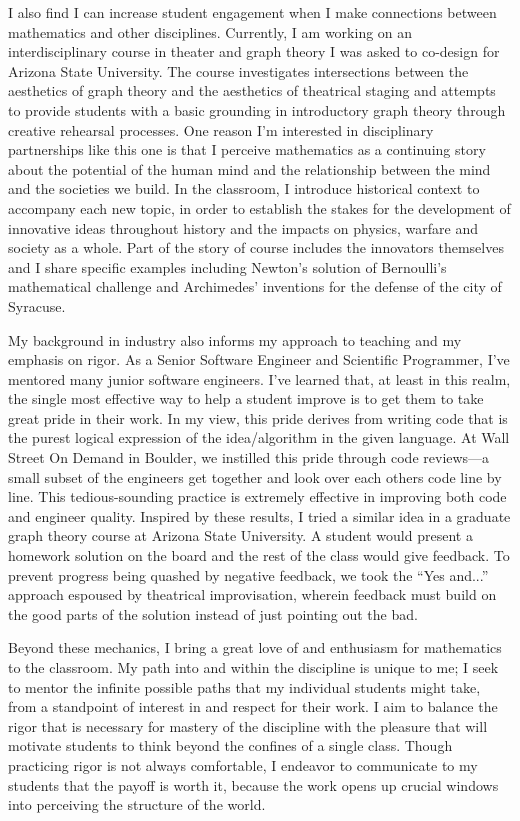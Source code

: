 \documentclass[12pt]{article}
\begin{document}
I also find I can increase student engagement when I make connections between mathematics and other disciplines. Currently, I am working on an interdisciplinary course in theater and graph theory I was asked to co-design for Arizona State University. The course investigates intersections between the aesthetics of graph theory and the aesthetics of theatrical staging and attempts to provide students with a basic grounding in introductory graph theory through creative rehearsal processes. One reason I'm interested in disciplinary partnerships like this one is that I perceive mathematics as a continuing story about the potential of the human mind and the relationship between the mind and the societies we build. In the classroom, I introduce historical context to accompany each new topic, in order to establish the stakes for the development of innovative ideas throughout history and the impacts on physics, warfare and society as a whole. Part of the story of course includes the innovators themselves and I share specific examples including Newton's solution of Bernoulli's mathematical challenge and Archimedes' inventions for the defense of the city of Syracuse.

My background in industry also informs my approach to teaching and my emphasis on rigor. As a Senior Software Engineer and Scientific Programmer, I've mentored many junior software engineers. I've learned that, at least in this realm, the single most effective way to help a student improve is to get them to take great pride in their work. In my view, this pride derives from writing code that is the purest logical expression of the idea/algorithm in the given language. At Wall Street On Demand in Boulder, we instilled this pride through code reviews---a small subset of the engineers get together and look over each others code line by line.  This tedious-sounding practice is extremely effective in improving both code and engineer quality. Inspired by these results, I tried a similar idea in a graduate graph theory course at Arizona State University. A student would present a homework solution on the board and the rest of the class would give feedback.  To prevent progress being quashed by negative feedback, we took the ``Yes and...'' approach espoused by theatrical improvisation, wherein feedback must build on the good parts of the solution instead of just pointing out the bad.
 
Beyond these mechanics, I bring a great love of and enthusiasm for mathematics to the classroom. My path into and within the discipline is unique to me; I seek to mentor the infinite possible paths that my individual students might take, from a standpoint of interest in and respect for their work. I aim to balance the rigor that is necessary for mastery of the discipline with the pleasure that will motivate students to think beyond the confines of a single class. Though practicing rigor is not always comfortable, I endeavor to communicate to my students that the payoff is worth it, because the work opens up crucial windows into perceiving the structure of the world. 
\end{document}
